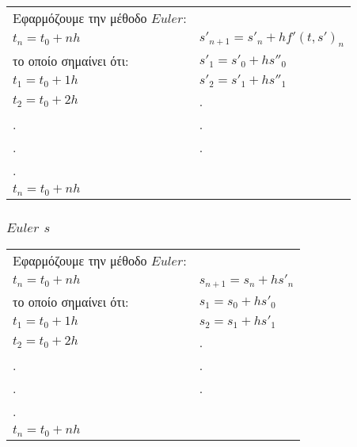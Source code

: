 \documentclass[a4paper]{article}
\begin{document}
        
            \begin{tabular}{ll}
                Εφαρμόζουμε την μέθοδο $Euler$:                             &                               \\
                $t_n=t_0+nh$                                                & $s'_{n+1}=s'_n+hf'(t,s')_n$   \\
                το οποίο σημαίνει ότι:                                      & $s'_1=s'_0+hs''_0$            \\
                $t_1=t_0+1h$                                                & $s'_2=s'_1+hs''_1$            \\
                $t_2=t_0+2h$                                                & .                             \\
                .                                                           & .                             \\
                .                                                           & .                             \\
                .                                                           &                               \\
                $t_n=t_0+nh$                                                &                         
            \end{tabular}

            \subsubsection*{$Euler$ $s$}
            \begin{tabular}{ll}
                Εφαρμόζουμε την μέθοδο $Euler$:                             &                               \\
                $t_n=t_0+nh$                                                & $s_{n+1}=s_n+hs'_n$   \\
                το οποίο σημαίνει ότι:                                      & $s_1=s_0+hs'_0$            \\
                $t_1=t_0+1h$                                                & $s_2=s_1+hs'_1$            \\
                $t_2=t_0+2h$                                                & .                             \\
                .                                                           & .                             \\
                .                                                           & .                             \\
                .                                                           &                               \\
                $t_n=t_0+nh$                                                &                         
            \end{tabular}
\end{document}
